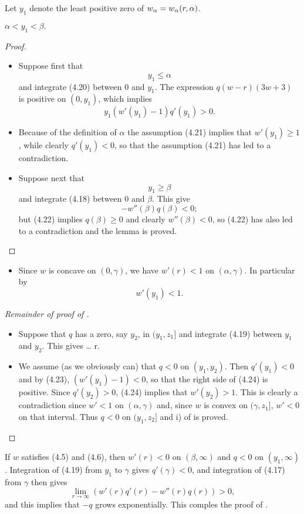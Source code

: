 Let $y_1$ denote the least positive zero of $w_\alpha=w_\alpha(r,\alpha)$.
\begin{lemma}
    $\alpha < y_1 < \beta.$
\end{lemma}
\begin{proof}
\begin{itemize}
    \item Suppose first that $$y_1\leq\alpha$$ and integrate (4.20) between 0 and
        $y_1$. The expression $q(w-r)(3w+3)$ is positive on $(0,y_1)$, which
        implies $$y_1(w'(y_1)-1)q'(y_1)>0.$$
    \item Because of the definition of $\alpha$ the assumption (4.21) implies
        that $w'(y_1)\geq 1$, while clearly $q'(y_1)<0$, so that the assumption
        (4.21) has led to a contradiction.
    \item Suppose next that $$y_1\geq\beta$$ and integrate (4.18) between 0 and
        $\beta$. This give $$-w''(\beta)q(\beta)<0;$$ but (4.22) implies
        $q(\beta)\geq0$ and clearly $w''(\beta)<0$, so (4.22) has also led to a
        contradiction and the lemma is proved.
\end{itemize}
\end{proof}

\begin{itemize}
    \item Since $w$ is concave on $(0,\gamma)$, we have $w'(r)<1$ on
        $(\alpha,\gamma)$. In particular by  $$w'(y_1)<1.$$
\end{itemize}
\begin{proof}[Remainder of proof of ]
\begin{itemize}
    \item Suppose that $q$ has a zero, say $y_2$, in $(y_1,z_1]$ and integrate
        (4.19) between $y_1$ and $y_2$. This gives \be\label{y2wqint}\ldots\diff
        r.\ee
    \item We assume (as we obviously can) that $q<0$ on $(y_1,y_2)$. Then
        $q'(y_1)<0$ and by (4.23), $(w'(y_1)-1)<0$, so that the right side of
        (4.24) is positive. Since $q'(y_2)>0$, (4.24) implies that $w'(y_2)>1$.
        This is clearly a contradiction since $w'<1$ on $(\alpha,\gamma)$ and,
        since $w$ is convex on $(\gamma,z_1]$, $w'<0$ on that interval. Thus
        $q<0$ on $(y_1,z_2]$ and i) of  is proved.

\end{itemize}
\end{proof}

If $w$ satisfies (4.5) and (4.6), then $w'(r)<0$ on $(\beta,\infty)$ and $q<0$
on $(y_1,\infty)$. Integration of (4.19) from $y_1$ to $\gamma$ gives
$q'(\gamma)<0$, and integration of (4.17) from $\gamma$ then gives
$$\lim_{r\to\infty}(w'(r)q'(r)-w''(r)q(r))>0,$$ and this implies that $-q$ grows
exponentially. This comples the proof of .

